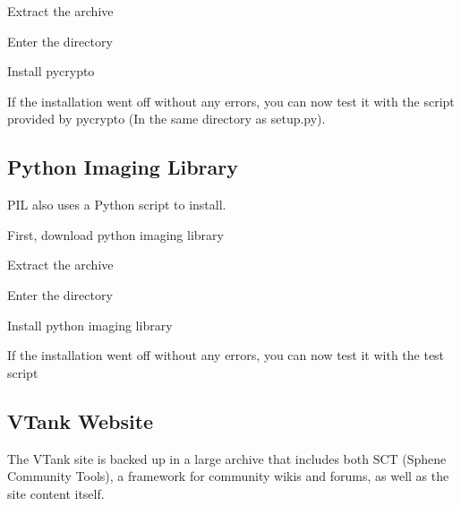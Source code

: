 Extract the archive


\vspace{1pc}

Enter the directory


\vspace{1pc}

Install pycrypto


\vspace{1pc}

If the installation went off without any errors, you can now test it with the script provided by pycrypto (In the same directory as setup.py).


\vspace{1pc}

\subsection{Python Imaging Library}
PIL also uses a Python script to install.

\vspace{1pc}

First, download python imaging library


\vspace{1pc}

Extract the archive


\vspace{1pc}

Enter the directory


\vspace{1pc}

Install python imaging library


\vspace{1pc}

If the installation went off without any errors, you can now test it with the test script


\subsection{VTank Website}
The VTank site is backed up in a large archive that includes both SCT (Sphene Community Tools), a framework for community wikis and forums, as well as the site content itself.

